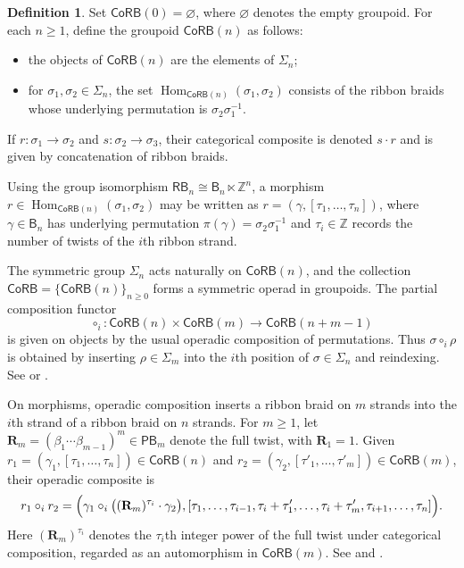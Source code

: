 \documentclass{amsart}
\newcommand{\CoRB}{\mathsf{CoRB}}
\newcommand{\Hom}{\operatorname{Hom}}
\newcommand{\Br}{\mathsf{B}} %
\newcommand{\PB}{\mathsf{PB}} %
\newcommand{\RB}{\mathsf{RB}} %
\theoremstyle{definition}
\newtheorem{definition}[theorem]{Definition}%
\numberwithin{equation}{section}
\begin{document}
\begin{definition}
Set $\CoRB(0)=\varnothing$, where $\varnothing$ denotes the empty
groupoid. For each $n\geq1$, define the groupoid $\CoRB(n)$ as follows:
\begin{itemize}
\item the objects of $\CoRB(n)$ are the elements of $\Sigma_n$;
\item for $\sigma_1,\sigma_2\in\Sigma_n$, the set
$\Hom_{\CoRB(n)}(\sigma_1,\sigma_2)$ consists of the ribbon braids
whose underlying permutation is $\sigma_2\sigma_1^{-1}$.
\end{itemize}
If $r\colon\sigma_1\to\sigma_2$ and
$s\colon\sigma_2\to\sigma_3$, their categorical composite is denoted
$s\cdot r$ and is given by concatenation of ribbon braids.

Using the group isomorphism
$\RB_n\cong\Br_n\ltimes\mathbb Z^n$, a morphism
$r\in\Hom_{\CoRB(n)}(\sigma_1,\sigma_2)$ may be written as
$r=(\gamma,[\tau_1,\ldots,\tau_n])$, where
$\gamma\in\Br_n$ has underlying permutation
$\pi(\gamma)=\sigma_2\sigma_1^{-1}$ and
$\tau_i\in\mathbb Z$ records the number of twists of the $i$th ribbon
strand.
\end{definition}

The symmetric group $\Sigma_n$ acts naturally on $\CoRB(n)$, and the
collection $\CoRB=\{\CoRB(n)\}_{n\geq0}$ forms a symmetric operad in
groupoids. The partial composition functor
\[
\circ_i\colon
\CoRB(n)\times\CoRB(m)\longrightarrow\CoRB(n+m-1)
\]
is given on objects by the usual operadic composition of permutations.
Thus $\sigma\circ_i\rho$ is obtained by inserting
$\rho\in\Sigma_m$ into the $i$th position of
$\sigma\in\Sigma_n$ and reindexing. See
\cite[Section~5.2]{FresseBook1} or
\cite[Definition~6.1]{Boavida-Horel-Robertson}.

On morphisms, operadic composition inserts a ribbon braid on $m$
strands into the $i$th strand of a ribbon braid on $n$ strands. For
$m\geq1$, let
$\mathbf R_m=(\beta_1\cdots\beta_{m-1})^m\in\PB_m$ denote the full
twist, with $\mathbf R_1=1$. Given
$r_1=(\gamma_1,[\tau_1,\ldots,\tau_n])\in\CoRB(n)$ and
$r_2=(\gamma_2,[\tau'_1,\ldots,\tau'_m])\in\CoRB(m)$, their operadic
composite is
\[
r_1\circ_i r_2 = \Bigl( \gamma_1\circ_i \bigl((\mathbf R_m)^{\tau_i}\cdot\gamma_2\bigr), [\tau_1,\ldots,\tau_{i-1}, \tau_i+\tau'_1,\ldots,\tau_i+\tau'_m, \tau_{i+1},\ldots,\tau_n] \Bigr).
\]
Here $(\mathbf R_m)^{\tau_i}$ denotes the $\tau_i$th integer power of
the full twist under categorical composition, regarded as an
automorphism in $\CoRB(m)$. See
\cite[Definition~6.4]{Boavida-Horel-Robertson} and
\cite[Section~1.5]{Wahl_Thesis}.
\end{document}
